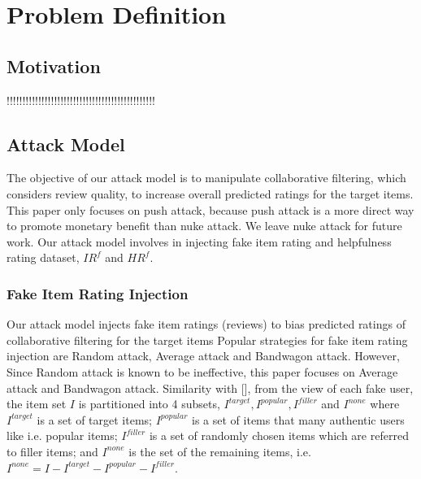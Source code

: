\documentclass[master,english,final]{kaist-ucs}
\begin{document}
\chapter{Problem Definition}
\section{Motivation}
!!!!!!!!!!!!!!!!!!!!!!!!!!!!!!!!!!!!!!!!!!!!!!!

\section{Attack Model}
The objective of our attack model is to manipulate collaborative filtering, which considers review quality, to increase overall predicted ratings for the target items.
This paper only focuses on push attack, because push attack is a more direct way to promote monetary benefit than nuke attack.
We leave nuke attack for future work.
Our attack model involves in injecting fake item rating and helpfulness rating dataset, $IR^f$ and $HR^f$.

\subsection{Fake Item Rating Injection}
Our attack model injects fake item ratings (reviews) to bias predicted ratings of collaborative filtering for the target items
Popular strategies for fake item rating injection are Random attack, Average attack and Bandwagon attack.
However, Since Random attack is known to be ineffective, this paper focuses on Average attack and Bandwagon attack.
Similarity with [], from the view of each fake user, the item set $I$ is partitioned into 4 subsets, $I^{target},I^{popular},I^{filler}$  and $I^{none}$ where $I^{target}$ is a set of target items; $I^{popular}$ is a set of items that many authentic users like i.e. popular items; $I^{filler}$ is a set of randomly chosen items which are referred to filler items; and $I^{none}$ is the set of the remaining items, i.e. $I^{none}=I-I^{target}-I^{popular}-I^{filler}$.
\end{document}
